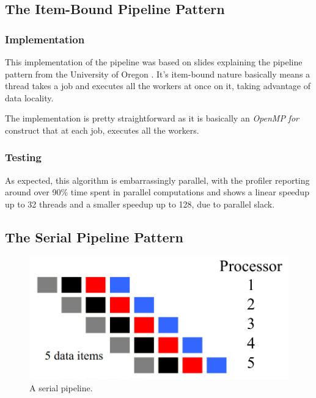 \documentclass[10pt,journal]{IEEEtran}
\begin{document}
\subsection{The Item-Bound Pipeline Pattern}
\label{itembound}

\subsubsection{Implementation}

This implementation of the pipeline was based on slides explaining the pipeline pattern from the University of Oregon \cite{pipelineoregon}. It's item-bound nature basically means a thread takes a job and executes all the workers at once on it, taking advantage of data locality.

The implementation is pretty straightforward as it is basically an \textit{OpenMP} \textit{for} construct that at each job, executes all the workers.

\subsubsection{Testing}

As expected, this algorithm is embarrassingly parallel, with the profiler reporting around over 90\% time spent in parallel computations and shows a linear speedup up to 32 threads and a smaller speedup up to 128, due to parallel slack.

\subsection{The Serial Pipeline Pattern}

\begin{figure}[htbp]
	\centerline{\includegraphics[scale=0.15]{img/serialpipeline.png}}
	\caption{ A serial pipeline. \cite{pipelineoregon} }
	\label{serialpipe}
\end{figure}
\end{document}
